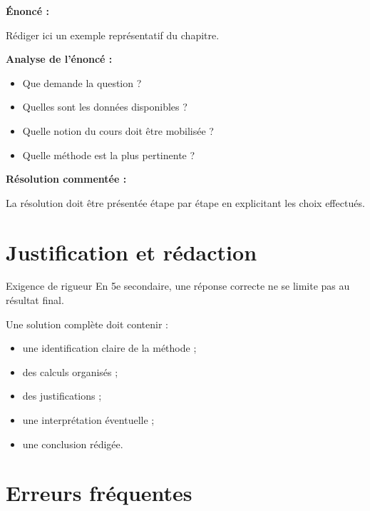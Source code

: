 \documentclass[11pt,a4paper]{article}
\begin{document}
\begin{cadreexemple}
\textbf{Énoncé :}

Rédiger ici un exemple représentatif du chapitre.

\medskip

\textbf{Analyse de l’énoncé :}
\begin{itemize}
    \item Que demande la question ?
    \item Quelles sont les données disponibles ?
    \item Quelle notion du cours doit être mobilisée ?
    \item Quelle méthode est la plus pertinente ?
\end{itemize}

\medskip

\textbf{Résolution commentée :}

La résolution doit être présentée étape par étape en explicitant les choix effectués.
\end{cadreexemple}

\section{Justification et rédaction}

\begin{cadrevert}{Exigence de rigueur}
En 5e secondaire, une réponse correcte ne se limite pas au résultat final.

Une solution complète doit contenir :
\begin{itemize}
    \item une identification claire de la méthode ;
    \item des calculs organisés ;
    \item des justifications ;
    \item une interprétation éventuelle ;
    \item une conclusion rédigée.
\end{itemize}
\end{cadrevert}

\section{Erreurs fréquentes}
\end{document}
